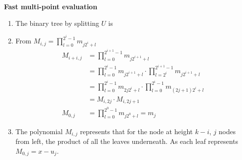 \documentclass{assignment}
\begin{document}
    \maketitle

    \newpage

    \begin{homeworkProblem}
\begin{center}
\textbf{Fast multi-point evaluation}
\end{center}    
    
\begin{enumerate}
\item The binary tree by splitting $U$ is 

\begin{center}
 \end{center}

\item From $M_{i,j}=\prod_{l=0}^{2^i-1}m_{j2^i+l}$
\begin{align*}
M_{i+i,j}&=\prod_{l=0}^{2^{i+1}-1}m_{j2^{i+1}+l}\\
&= \prod_{l=0}^{2^{i}-1}m_{j2^{i+1}+l} \cdot \prod_{l=2^i}^{2^{i+1}-1}m_{j2^{i+1}+l} \\
&= \prod_{l=0}^{2^{i}-1}m_{2j2^{i}+l} \cdot\prod_{l=0}^{2^i-1}m_{(2j+1)2^i+l} \\
&=M_{i,2j} \cdot M_{i,2j+1}\\[2ex]
M_{0,j}&=\prod_{l=0}^{2^0-1}m_{j2^0+l} =m_j
\end{align*}
\item The polynomial $M_{i,j}$ represents that for the node at height $k-i$, $j$ nodes from left, the product of all the leaves underneath. As each leaf represents $M_{0,j}=x-u_j$. 


\end{enumerate}
\end{homeworkProblem}
\end{document}
